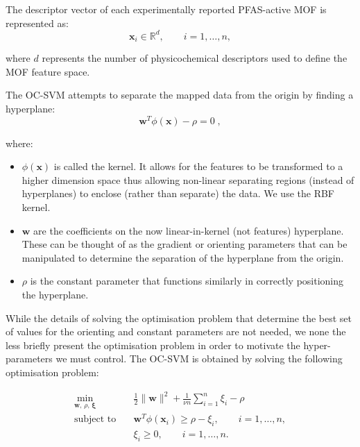 \documentclass[twoside,twocolumn,9pt]{article}
\begin{document}
The descriptor vector of each experimentally reported PFAS-active MOF is represented as:
\begin{equation}
	\mathbf{x}_i\in \mathbb{R}^d, \qquad
	i= 1, \ldots, n,
	\label{eq:feature-vector}
\end{equation}

where $d$ represents the number of physicochemical descriptors used to define the MOF feature space.

The OC-SVM attempts to separate the mapped data from the origin by finding a hyperplane:
\begin{equation}
	\mathbf{w}^{T}\phi(\mathbf{x}) - \rho = 0\;,
	\label{eq:ocsvm-hyperplane}
\end{equation}

where: 
\begin{itemize}
	\item \( \phi(\mathbf{x}) \) is called the kernel. It allows for the features to be transformed to a higher dimension space thus allowing non-linear separating regions (instead of hyperplanes) to enclose (rather than separate) the data. We use the RBF kernel.
	\item \(\mathbf{w}\) are the coefficients on the now linear-in-kernel (not features) hyperplane. These can be thought of as the gradient or orienting parameters that can be manipulated to determine the separation of the hyperplane from the origin.
	\item \(\rho\) is the constant parameter that functions similarly in correctly positioning the hyperplane.
\end{itemize}

While the details of solving the optimisation problem that determine the best set of values for the orienting and constant parameters are not needed, we none the less briefly present the optimisation problem in order to motivate the hyper-parameters we must control. The OC-SVM is obtained by solving the following optimisation problem:

\begin{equation}
	\begin{aligned}
		\min_{\mathbf{w},\,\rho,\,\boldsymbol{\xi}}\quad
		& \frac{1}{2}\|\mathbf{w}\|^2
		+ \frac{1}{\nu n}\sum_{i=1}^{n}\xi_i
		- \rho \\
		\text{subject to}\quad
		& \mathbf{w}^{T}\phi(\mathbf{x}_i) \geq \rho - \xi_i,
		\qquad i=1,\ldots,n,\\
		& \xi_i \geq 0,
		\qquad i=1,\ldots,n.
	\end{aligned}
	\label{eq:ocsvm-primal}
\end{equation}
\end{document}
